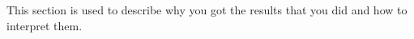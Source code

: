 \documentclass[../00_Main.tex]{subfiles}
\begin{document}
This section is used to describe why you got the results that you did and how to interpret them.


\biblio %
\end{document}
